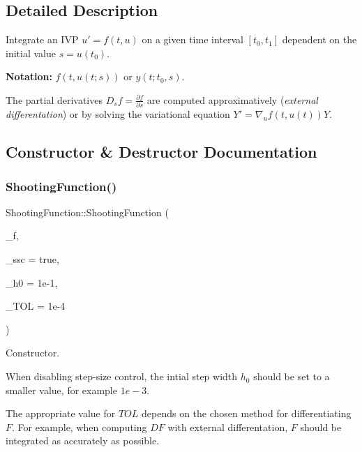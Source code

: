 \subsection{Detailed Description}
Integrate an I\+VP $u' = f(t, u)$ on a given time interval $[t_0, t_1]$ dependent on the initial value $s = u(t_0)$. 

{\bfseries Notation\+:} $f(t, u(t; s))$ or $y(t; t_0, s)$.

The partial derivatives $D_s f = \frac{\partial f}{\partial s}$ are computed approximatively ({\itshape external} {\itshape differentation}) or by solving the variational equation $Y' = \nabla_u f(t, u(t)) Y$. 

\subsection{Constructor \& Destructor Documentation}
\mbox{\label{classShootingFunction_a84f50a64e417a35a9a9c3dc561fbb9a9}} 
\subsubsection{\texorpdfstring{Shooting\+Function()}{ShootingFunction()}}
{\footnotesize\ttfamily Shooting\+Function\+::\+Shooting\+Function (\begin{DoxyParamCaption}\item[{\hyperlink{classTimeFunctor}{Time\+Functor} \&}]{\+\_\+f,  }\item[{bool}]{\+\_\+ssc = {\ttfamily true},  }\item[{F\+P\+\_\+\+Type}]{\+\_\+h0 = {\ttfamily 1e-\/1},  }\item[{F\+P\+\_\+\+Type}]{\+\_\+\+T\+OL = {\ttfamily 1e-\/4} }\end{DoxyParamCaption})\hspace{0.3cm}{\ttfamily [inline]}}



Constructor. 

When disabling step-\/size control, the intial step width $h_0$ should be set to a smaller value, for example $1e-3$.

The appropriate value for $TOL$ depends on the chosen method for differentiating $F$. For example, when computing $DF$ with external differentation, $F$ should be integrated as accurately as possible. 

